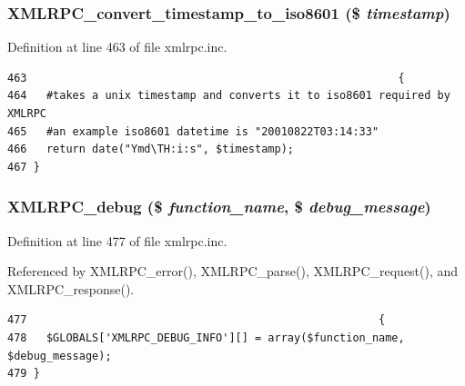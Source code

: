 \hypertarget{xmlrpc_8inc_4485d809c5d598949d9cfaca42bddf37}{
\subsubsection{\setlength{\rightskip}{0pt plus 5cm}XMLRPC\_\-convert\_\-timestamp\_\-to\_\-iso8601 (\$ {\em timestamp})}}
\label{xmlrpc_8inc_4485d809c5d598949d9cfaca42bddf37}




Definition at line 463 of file xmlrpc.inc.

\begin{Code}\begin{verbatim}463                                                         {
464   #takes a unix timestamp and converts it to iso8601 required by XMLRPC
465   #an example iso8601 datetime is "20010822T03:14:33"
466   return date("Ymd\TH:i:s", $timestamp);
467 }
\end{verbatim}
\end{Code}


\hypertarget{xmlrpc_8inc_e2d2e97a8c1c560f5e96d58d60a02874}{
\subsubsection{\setlength{\rightskip}{0pt plus 5cm}XMLRPC\_\-debug (\$ {\em function\_\-name}, \$ {\em debug\_\-message})}}
\label{xmlrpc_8inc_e2d2e97a8c1c560f5e96d58d60a02874}




Definition at line 477 of file xmlrpc.inc.

Referenced by XMLRPC\_\-error(), XMLRPC\_\-parse(), XMLRPC\_\-request(), and XMLRPC\_\-response().

\begin{Code}\begin{verbatim}477                                                      {
478   $GLOBALS['XMLRPC_DEBUG_INFO'][] = array($function_name, $debug_message);
479 }
\end{verbatim}
\end{Code}




